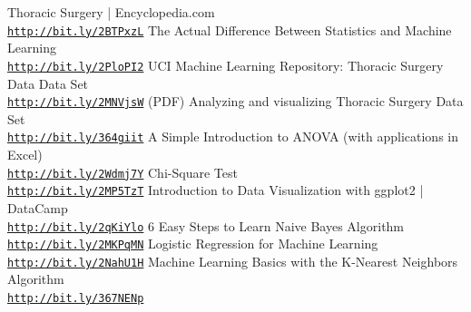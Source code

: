 \documentclass[a4paper, 11pt, oneside]{article} %
\begin{document}
 \begin{thebibliography}{999}


Thoracic Surgery | Encyclopedia.com
\\\texttt{\url{http://bit.ly/2BTPxzL}}
The Actual Difference Between Statistics and Machine Learning
\\\texttt{\url{http://bit.ly/2PloPI2}}
UCI Machine Learning Repository: Thoracic Surgery Data Data Set
\\\texttt{\url{http://bit.ly/2MNVjsW}}
(PDF) Analyzing and visualizing Thoracic Surgery Data Set
\\\texttt{\url{http://bit.ly/364giit}}
A Simple Introduction to ANOVA (with applications in Excel)
\\\texttt{\url{http://bit.ly/2Wdmj7Y}}
Chi-Square Test
\\\texttt{\url{http://bit.ly/2MP5TzT}}
Introduction to Data Visualization with ggplot2 | DataCamp
\\\texttt{\url{http://bit.ly/2qKiYlo}}
6 Easy Steps to Learn Naive Bayes Algorithm 
\\\texttt{\url{http://bit.ly/2MKPqMN}}
Logistic Regression for Machine Learning
\\\texttt{\url{http://bit.ly/2NahU1H}}
Machine Learning Basics with the K-Nearest Neighbors Algorithm
\\\texttt{\url{http://bit.ly/367NENp}}

\end{thebibliography}
\end{document}
